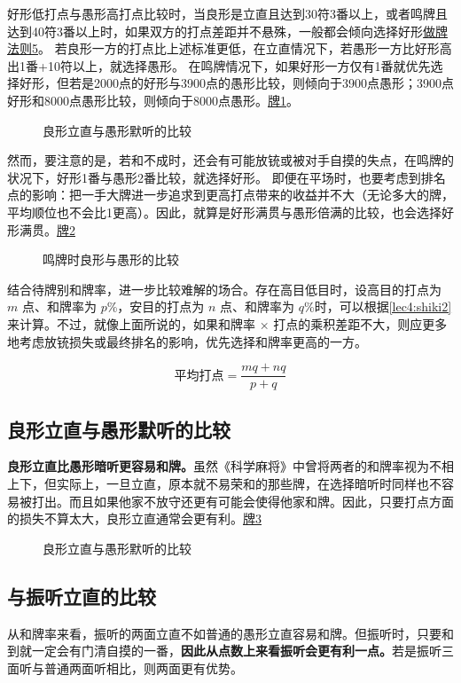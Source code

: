 好形低打点与愚形高打点比较时，当良形是立直且达到30符3番以上，或者鸣牌且达到40符3番以上时，如果双方的打点差距并不悬殊，一般都会倾向选择好形\hyperref[lec1:做牌法则5]{做牌法则5}。
若良形一方的打点比上述标准更低，在立直情况下，若愚形一方比好形高出1番+10符以上，就选择愚形。
在鸣牌情况下，如果好形一方仅有1番就优先选择好形，但若是2000点的好形与3900点的愚形比较，则倾向于3900点愚形；3900点好形和8000点愚形比较，则倾向于8000点愚形。\hyperref[lec4:pai1]{牌1}。
\begin{figure}[h]
    \caption{良形立直与愚形默听的比较}\label{lec4:pai1}
\end{figure}
然而，要注意的是，若和不成时，还会有可能放铳或被对手自摸的失点，在鸣牌的状况下，好形1番与愚形2番比较，就选择好形。
即便在平场时，也要考虑到排名点的影响：把一手大牌进一步追求到更高打点带来的收益并不大（无论多大的牌，平均顺位也不会比1更高）。因此，就算是好形满贯与愚形倍满的比较，也会选择好形满贯。\hyperref[lec4:pai2]{牌2}
\begin{figure}[h]
    \caption{鸣牌时良形与愚形的比较}\label{lec4:pai2}
\end{figure}
结合待牌别和牌率，进一步比较难解的场合。存在高目低目时，设高目的打点为 $m$ 点、和牌率为 $p$\%，安目的打点为 $n$ 点、和牌率为 $q$\%时，可以根据\ref{lec4:shiki2}来计算。不过，就像上面所说的，如果和牌率 × 打点的乘积差距不大，则应更多地考虑放铳损失或最终排名的影响，优先选择和牌率更高的一方。
\begin{shiki}[高低目的平均打点]\label{lec4:shiki2}
    \[\mathrm{平均打点} = \frac{mq+nq}{p+q}\]
\end{shiki}

\subsection{良形立直与愚形默听的比较}
\textbf{良形立直比愚形暗听更容易和牌。}虽然《科学麻将》中曾将两者的和牌率视为不相上下，但实际上，一旦立直，原本就不易荣和的那些牌，在选择暗听时同样也不容易被打出。而且如果他家不放守还更有可能会使得他家和牌。因此，只要打点方面的损失不算太大，良形立直通常会更有利。\hyperref[lec4:pai3]{牌3}
\begin{figure}[h]
    \caption{良形立直与愚形默听的比较}\label{lec4:pai3}
\end{figure}

\subsection{与振听立直的比较}
从和牌率来看，振听的两面立直不如普通的愚形立直容易和牌。但振听时，只要和到就一定会有门清自摸的一番，\textbf{因此从点数上来看振听会更有利一点。}若是振听三面听与普通两面听相比，则两面更有优势。


